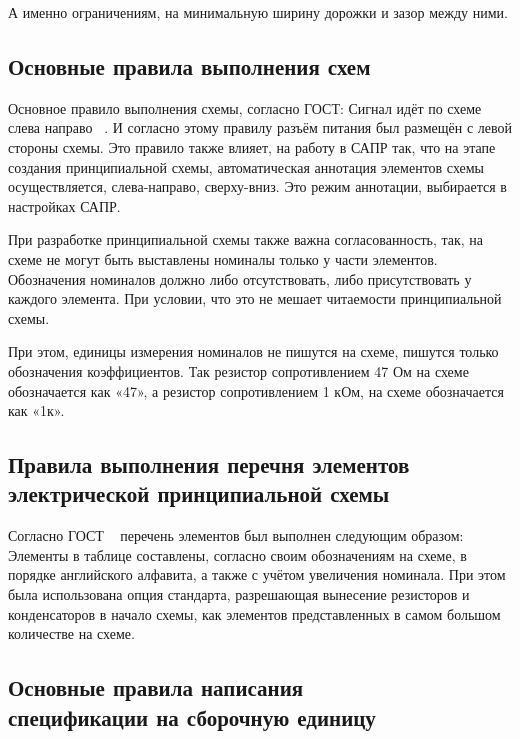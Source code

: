 А именно ограничениям, 
на минимальную ширину дорожки и зазор между ними.

\subsection{Основные правила выполнения схем}

Основное правило выполнения схемы, согласно ГОСТ:
Сигнал идёт по схеме слева направо ~\cite{GOST-2-702-2011}.
И согласно этому правилу разъём питания был размещён с левой стороны схемы.
Это правило также влияет,
на работу в САПР так,
что на этапе создания принципиальной схемы,
автоматическая аннотация элементов схемы осуществляется,
слева-направо, сверху-вниз.
Это режим аннотации,
выбирается в настройках САПР.

При разработке принципиальной схемы также важна согласованность,
так, на схеме не могут быть выставлены номиналы только у части
элементов.
Обозначения номиналов должно либо отсутствовать,
либо присутствовать у каждого элемента. При условии,
что это не мешает читаемости принципиальной схемы.

При этом,
единицы измерения номиналов не пишутся на схеме,
пишутся только обозначения коэффициентов.
Так резистор сопротивлением 47 Ом на схеме обозначается как «47», а
резистор сопротивлением 1 кОм, на схеме обозначается как «1к».

\subsection{Правила выполнения
  перечня элементов\\
  электрической принципиальной схемы}

Согласно ГОСТ ~\cite{GOST-2-702-2011} перечень
элементов был выполнен следующим образом:
Элементы в таблице составлены,
согласно своим обозначениям на схеме, в порядке английского алфавита,
а также с учётом увеличения номинала.
При этом была использована опция стандарта,
разрешающая вынесение резисторов и конденсаторов
в начало схемы, как элементов представленных
в самом большом количестве на схеме.

\subsection{Основные правила написания\\
  спецификации на сборочную единицу}

